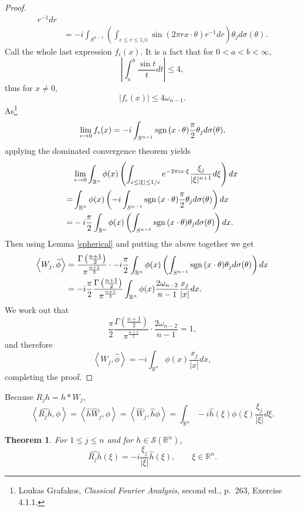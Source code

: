 \documentclass{article}
\newcommand{\inner}[2]{\left\langle #1, #2 \right\rangle}
\newcommand{\sgn}{\ensuremath\mathrm{sgn}\,}
\newtheorem{theorem}{Theorem}
\theoremstyle{definition}
\begin{document}
\begin{proof}
\begin{align*}
r^{-1} dr\\
&=-i \int_{S^{n-1}} \left( \int_{\epsilon \leq r \leq 1/\epsilon} \sin(2\pi rx\cdot \theta) r^{-1} dr \right) \theta_j
d\sigma(\theta). 
\end{align*}
Call the whole last expression $f_\epsilon(x)$.
It is a fact that
for $0<a<b<\infty$,
\[
\left| \int_a^b \frac{\sin t}{t} dt \right| \leq 4,
\]
thus for $x \neq 0$,
\[
|f_\epsilon(x)| \leq 4\omega_{n-1}.
\]
As\footnote{Loukas Grafakos, {\em Classical Fourier Analysis}, second ed.,
p.~263, Exercise 4.1.1.}
\[
\lim_{\epsilon \to 0}f_\epsilon(x)=- i\int_{S^{n-1}} \sgn(x\cdot \theta) \frac{\pi}{2} \theta_j d\sigma(\theta),
\]
applying the dominated convergence theorem yields
\[
\begin{split}
& \lim_{\epsilon \to 0} \int_{\mathbb{R}^n}
\phi(x) \left( \int_{\epsilon \leq |\xi| \leq 1/\epsilon} e^{-2\pi ix\cdot \xi} \frac{\xi_j}{|\xi|^{n+1}} d\xi \right) dx\\
=&\int_{\mathbb{R}^n} \phi(x) \left(- i\int_{S^{n-1}} \sgn(x\cdot \theta) \frac{\pi}{2} \theta_j d\sigma(\theta)\right) dx\\
=&-i\frac{\pi}{2} \int_{\mathbb{R}^n}\phi(x) \left( \int_{S^{n-1}} \sgn(x\cdot \theta) \theta_j d\sigma(\theta) \right) dx.
\end{split}
\]
Then using Lemma \ref{spherical} and putting the above together we get
\begin{align*}
\inner{W_j}{\widehat{\phi}}&=\frac{\Gamma\left(\frac{n+1}{2}\right)}{\pi^{\frac{n+1}{2}}}
\cdot -i\frac{\pi}{2} \int_{\mathbb{R}^n} \phi(x) \left( \int_{S^{n-1}} \sgn(x\cdot \theta) \theta_j d\sigma(\theta) \right) dx\\
&=-i\frac{\pi}{2} \frac{\Gamma\left(\frac{n+1}{2}\right)}{\pi^{\frac{n+1}{2}}} 
\int_{\mathbb{R}^n}\phi(x) \frac{2\omega_{n-2}}{n-1} \frac{x_j}{|x|} dx.
\end{align*}
We work out that
\[
\frac{\pi}{2} \frac{\Gamma\left(\frac{n+1}{2}\right)}{\pi^{\frac{n+1}{2}}} \cdot \frac{2\omega_{n-2}}{n-1} = 1,
\]
and therefore
\[
\inner{W_j}{\widehat{\phi}} = -i \int_{\mathbb{R}^n} \phi(x) \frac{x_j}{|x|} dx,
\]
completing the proof.
\end{proof}

Because $R_j h = h*W_j$, 
\[
\inner{\widehat{R_j h}}{\phi}=
\inner{\widehat{h} \widehat{W}_j}{\phi}
=\inner{\widehat{W}_j}{\widehat{h} \phi}
=\int_{\mathbb{R}^n} -i \widehat{h}(\xi) \phi(\xi) \frac{\xi_j}{|\xi|} d\xi.
\]

\begin{theorem}
For $1 \leq j \leq n$ and for $h \in \mathscr{S}(\mathbb{R}^n)$,
\[
\widehat{R_j h}(\xi) = -i\frac{\xi_j}{|\xi|} \widehat{h}(\xi),\qquad \xi \in \mathbb{R}^n.
\]
\label{rieszfourier}
\end{theorem}
\end{document}
